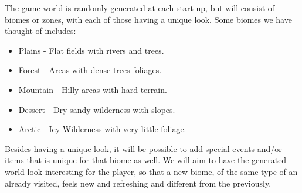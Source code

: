 The game world is randomly generated at each start up, but will consist of biomes or zones, with each of those having a unique look. Some biomes we have thought of includes:

\begin{itemize}
	\item Plains - Flat fields with rivers and trees.
	\item Forest - Areas with dense trees foliages.
	\item Mountain - Hilly areas with hard terrain.
	\item Dessert - Dry sandy wilderness with slopes.
	\item Arctic - Icy Wilderness with very little foliage.
\end{itemize}

Besides having a unique look, it will be possible to add special events and/or items that is unique for that biome as well. We will aim to have the generated world look interesting for the player, so that a new biome, of the same type of an already visited, feels new and refreshing and different from the previously.